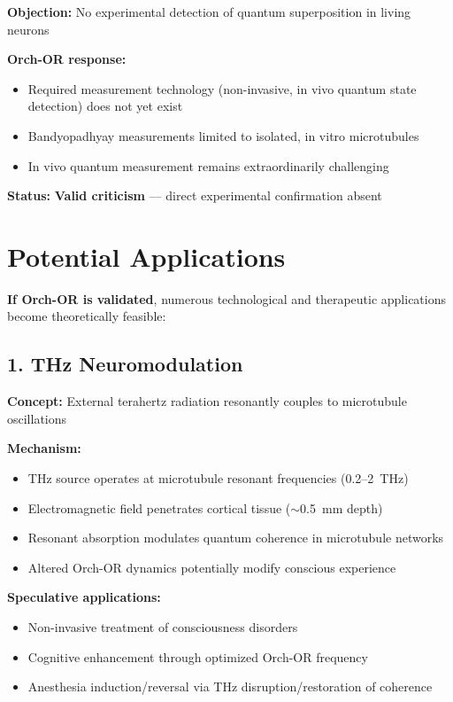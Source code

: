 \textbf{Objection:} No experimental detection of quantum superposition in living neurons

\textbf{Orch-OR response:}
\begin{itemize}
\item Required measurement technology (non-invasive, in vivo quantum state detection) does not yet exist
\item Bandyopadhyay measurements limited to isolated, in vitro microtubules
\item In vivo quantum measurement remains extraordinarily challenging
\end{itemize}

\textbf{Status:} \textbf{Valid criticism} --- direct experimental confirmation absent

\section{Potential Applications}

\textbf{If Orch-OR is validated}, numerous technological and therapeutic applications become theoretically feasible:

\subsection{1. THz Neuromodulation}

\textbf{Concept:} External terahertz radiation resonantly couples to microtubule oscillations

\textbf{Mechanism:}
\begin{itemize}
\item THz source operates at microtubule resonant frequencies (0.2--2~THz)
\item Electromagnetic field penetrates cortical tissue ($\sim$0.5~mm depth)
\item Resonant absorption modulates quantum coherence in microtubule networks
\item Altered Orch-OR dynamics potentially modify conscious experience
\end{itemize}

\textbf{Speculative applications:}
\begin{itemize}
\item Non-invasive treatment of consciousness disorders
\item Cognitive enhancement through optimized Orch-OR frequency
\item Anesthesia induction/reversal via THz disruption/restoration of coherence
\end{itemize}

